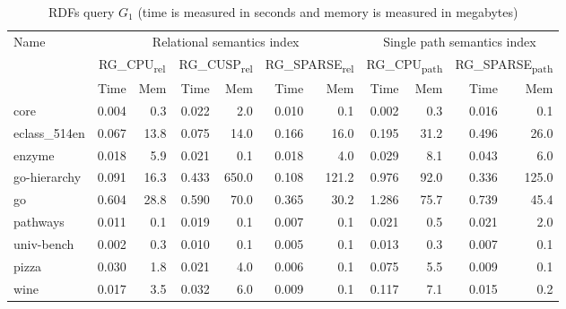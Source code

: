 {\setlength{\tabcolsep}{0.4em}
	\begin{table}[h]
		\caption{RDFs query $G_1$ (time is measured in seconds and memory is measured in megabytes)}
		\label{tbl:tableRDFQ1}
		\begin{tabular}{| l | r  r | r  r | r  r | r  r | r  r |}
			\hline
			
			\multirow{3}{*}{Name}   &   \multicolumn{6}{|c|}{Relational semantics index}	&	\multicolumn{4}{|c|}{Single path semantics index} \\
			\cline{2-11}
			&	\multicolumn{2}{|c|}{RG\_CPU\textsubscript{rel}}	&	\multicolumn{2}{|c|}{RG\_CUSP\textsubscript{rel}}	&	\multicolumn{2}{|c|}{RG\_SPARSE\textsubscript{rel}} &	\multicolumn{2}{|c|}{RG\_CPU\textsubscript{path}}	&	\multicolumn{2}{|c|}{RG\_SPARSE\textsubscript{path}}	 \\
			\cline{2-11}
			&   Time & Mem &  Time     & Mem & Time     & Mem  &  Time     & Mem & Time     & Mem \\
			\hline
			\hline
			core                        & 0.004 & 0.3  & 0.022 & 2.0   & 0.010  & 0.1      & 0.002 & 0.3  & 0.016 & 0.1  \\
			eclass\_514en                 & 0.067 & 13.8 & 0.075 & 14.0  & 0.166 & 16.0     & 0.195 & 31.2 & 0.496 & 26.0   \\
			enzyme                      & 0.018 & 5.9  & 0.021 & 0.1 & 0.018 & 4.0        & 0.029 & 8.1  & 0.043 & 6.0    \\
			go-hierarchy                & 0.091 & 16.3 & 0.433 & 650.0 & 0.108 & 121.2    & 0.976 & 92.0   & 0.336 & 125.0  \\
			go                          & 0.604 & 28.8 & 0.590  & 70.0  & 0.365 & 30.2     & 1.286 & 75.7 & 0.739 & 45.4 \\
			pathways                    & 0.011 & 0.1  & 0.019 & 0.1 & 0.007 & 0.1      & 0.021 & 0.5  & 0.021 & 2.0    \\	
			univ-bench                  & 0.002 & 0.3  & 0.010  & 0.1 & 0.005 & 0.1      & 0.013 & 0.3  & 0.007 & 0.1  \\
			pizza                       & 0.030  & 1.8  & 0.021 & 4.0   & 0.006 & 0.1      & 0.075 & 5.5  & 0.009 & 0.1  \\
			wine                        & 0.017 & 3.5  & 0.032 & 6.0   & 0.009 & 0.1      & 0.117 & 7.1  & 0.015 & 0.2  \\
			\hline
		\end{tabular}
	\end{table}
}

